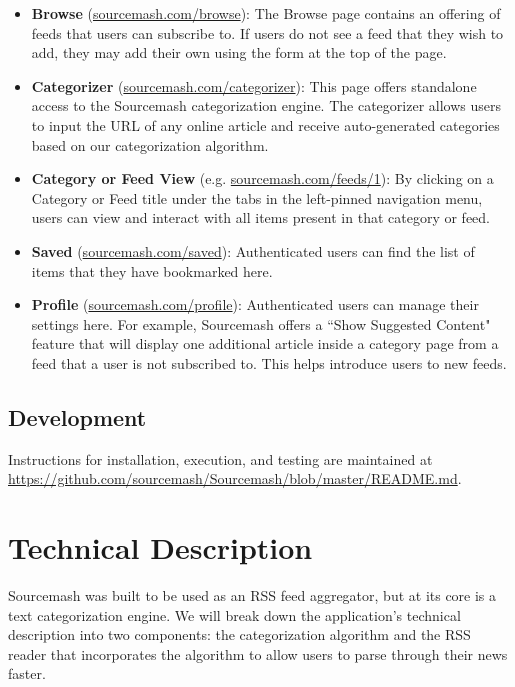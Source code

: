 \documentclass[11pt]{article}
\begin{document}
\begin{itemize}
	\item \textbf{Browse} (\url{sourcemash.com/browse}): The Browse page contains an offering of feeds that users can subscribe to. If users do not see a feed that they wish to add, they may add their own using the form at the top of the page.
	\item \textbf{Categorizer} (\url{sourcemash.com/categorizer}): This page offers standalone access to the Sourcemash categorization engine. The categorizer allows users to input the URL of any online article and receive auto-generated categories based on our categorization algorithm.
	\item \textbf{Category or Feed View} (e.g. \url{sourcemash.com/feeds/1}): By clicking on a Category or Feed title under the tabs in the left-pinned navigation menu, users can view and interact with all items present in that category or feed.
	\item \textbf{Saved} (\url{sourcemash.com/saved}): Authenticated users can find the list of items that they have bookmarked here.
	\item \textbf{Profile} (\url{sourcemash.com/profile}): Authenticated users can manage their settings here. For example, Sourcemash offers a ``Show Suggested Content" feature that will display one additional article inside a category page from a feed that a user is not subscribed to. This helps introduce users to new feeds.
\end{itemize}

\subsection{Development}

Instructions for installation, execution, and testing are maintained at \url{https://github.com/sourcemash/Sourcemash/blob/master/README.md}.



\section{Technical Description}

Sourcemash was built to be used as an RSS feed aggregator, but at its core is a text categorization engine. We will break down the application's technical description into two components: the categorization algorithm and the RSS reader that incorporates the algorithm to allow users to parse through their news faster.
\end{document}
